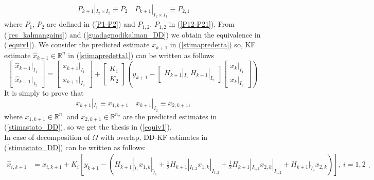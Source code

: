 \documentclass[smallcondensed]{svjour3}
\begin{document}
{\begin{equation}
\begin{array}{ll}
P_{k+1}|_{I_{2}\times I_{2}}\equiv P_{2} \quad P_{k+1}|_{I_{2}\times I_{1}}\equiv P_{2,1} 
\end{array}
\end{equation}
where $P_{1}$, $P_{2}$ are defined in (\ref{P1-P2}) and $P_{1,2}$, $P_{1,2}$ in (\ref{P12-P21}).
From (\ref{res_kalmangains}) and (\ref{guadagnodikalman_DD}) we obtain the equivalence in (\ref{equiv1}). We consider the predicted estimate $x_{k+1}$ in (\ref{stimapredetta}) so, KF estimate $\widehat{x}_{k+1}\in \mathbb{R}^{n}$ in (\ref{stimapredetta1}) can be written as follows
\begin{equation}
\left[\begin{array}{ll}
\widehat{x}_{k+1}|_{I_{1}}\\
\widehat{x}_{k+1}|_{I_{2}}
\end{array}\right]=\left[\begin{array}{ll}x_{k+1}|_{I_{1}}\\
x_{k+1}|_{I_{2}}
\end{array}\right]
+\left[\begin{array}{ll} K_{1}\\K_{2}\end{array}\right]\left( y_{k+1}-\left[\begin{array}{ll}
H_{k+1}|_{I_{1}}\ 
H_{k+1}|_{I_{2}}
\end{array}\right]\left[\begin{array}{ll}
{x}_{k}|_{I_{1}}\\
{x}_{k}|_{I_{2}}
\end{array}\right]\right).
\end{equation}
It is simply to prove that 
$$x_{k+1}|_{I_{1}}\equiv x_{1,k+1} \quad x_{k+1}|_{I_{2}}\equiv x_{2,k+1}, $$ where $x_{1,k+1}\in \mathbb{R}^{n_{1}}$ and $x_{2,k+1}\in \mathbb{R}^{n_{2}}$ are the predicted estimates in (\ref{stimastato_DD}), so we get the thesis in (\ref{equiv1}).\\[.5cm]
 In case of decomposition of $\Omega$ with overlap,  DD-KF estimates in (\ref{stimastato_DD})
can be written as follows:
\footnotesize
\begin{equation}\label{equiv_overlap}
\begin{array}{ll}
\widehat{x}_{i,k+1}&=x_{i,k+1}+K_{i}\left[y_{k+1}-(H_{k+1}|_{\tilde{I}_{1}}x_{1,k}|_{\tilde{I}_{1}} +\frac{1}{2}H_{k+1}|_{{I}_{1,2}}x_{1,k}|_{\tilde{I}_{1,2}}+\frac{1}{2}H_{k+1}|_{{I}_{1,2}}x_{2,k}|_{\tilde{I}_{1,2}} +H_{k+1}|_{\tilde{I}_{2}}x_{2,k})\right], \ i=1,2\\
\end{array}.
\end{equation}

}
\end{document}
